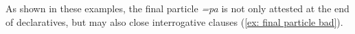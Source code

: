 As shown in these examples, the final particle \textit{=pa} is not only attested at the end of declaratives, but may also close interrogative clauses (\ref{ex: final particle bad}).


